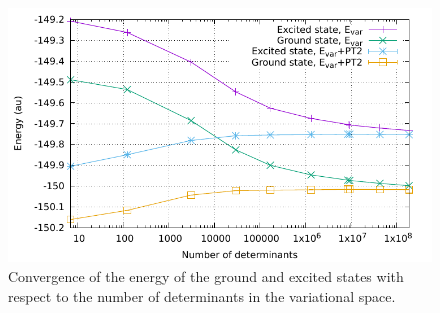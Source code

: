 \documentclass[./thesis.tex]{subfiles}
\begin{document}
\begin{figure}[h]
	\begin{center}
		\includegraphics[width=0.8\columnwidth]{figures/perf/cn3_energy}
		\caption{Convergence of the energy of the ground and excited states with respect to the number of determinants in the variational space.}
		\label{fig:energy_pt2}
	\end{center}
\end{figure}
\end{document}
